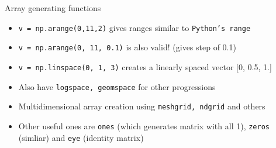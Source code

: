 \documentclass[presentation]{beamer}
\begin{document}
\begin{frame}[label={sec:org742b32d},fragile]{Array generating functions}
\begin{itemize}
\item \texttt{v = np.arange(0,11,2)} gives ranges similar to \texttt{Python's range}
\item \texttt{v = np.arange(0, 11, 0.1)} is also valid! (gives step of 0.1)
\item \texttt{v = np.linspace(0, 1, 3)} creates a linearly spaced vector [0, 0.5, 1.]
\item Also have \texttt{logspace, geomspace} for other progressions
\item Multidimensional array creation using \texttt{meshgrid, ndgrid} and others
\item Other useful ones are \texttt{ones} (which generates matrix with all 1), \texttt{zeros}
(simliar) and \texttt{eye} (identity matrix)
\end{itemize}
\end{frame}
\end{document}
